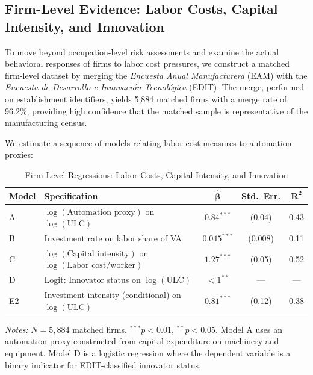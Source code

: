 \subsection{Firm-Level Evidence: Labor Costs, Capital Intensity, and Innovation}
\label{subsec:firm_results}

To move beyond occupation-level risk assessments and examine the actual behavioral responses of firms to labor cost pressures, we construct a matched firm-level dataset by merging the \textit{Encuesta Anual Manufacturera} (EAM) with the \textit{Encuesta de Desarrollo e Innovaci\'on Tecnol\'ogica} (EDIT). The merge, performed on establishment identifiers, yields 5,884 matched firms with a merge rate of 96.2\%, providing high confidence that the matched sample is representative of the manufacturing census.

We estimate a sequence of models relating labor cost measures to automation proxies:

\begin{table}[H]
\centering
\caption{Firm-Level Regressions: Labor Costs, Capital Intensity, and Innovation}
\label{tab:firm_results}
\begin{threeparttable}
\begin{tabular}{llccc}
\toprule
\textbf{Model} & \textbf{Specification} & $\boldsymbol{\hat{\beta}}$ & \textbf{Std.\ Err.} & $\boldsymbol{R^2}$ \\
\midrule
A & $\log(\text{Automation proxy})$ on $\log(\text{ULC})$ & $0.84^{***}$ & (0.04) & 0.43 \\
B & Investment rate on labor share of VA & $0.045^{***}$ & (0.008) & 0.11 \\
C & $\log(\text{Capital intensity})$ on $\log(\text{Labor cost/worker})$ & $1.27^{***}$ & (0.05) & 0.52 \\
\midrule
D & Logit: Innovator status on $\log(\text{ULC})$ & $<1^{**}$ & --- & --- \\
E2 & Investment intensity (conditional) on $\log(\text{ULC})$ & $0.81^{***}$ & (0.12) & 0.38 \\
\bottomrule
\end{tabular}
\begin{tablenotes}
\small
\item \textit{Notes:} $N = 5{,}884$ matched firms. $^{***}p<0.01$, $^{**}p<0.05$. Model A uses an automation proxy constructed from capital expenditure on machinery and equipment. Model D is a logistic regression where the dependent variable is a binary indicator for EDIT-classified innovator status.
\end{tablenotes}
\end{threeparttable}
\end{table}

